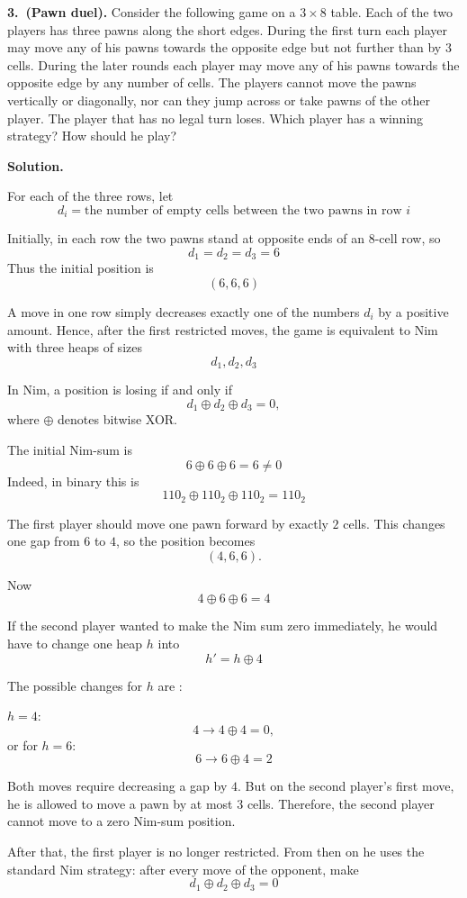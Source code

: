 \textbf{3.\ (Pawn duel).}
Consider the following game on a \(3\times 8\) table.
Each of the two players has three pawns along the short edges.
During the first turn each player may move any of his pawns towards the opposite
edge but not further than by \(3\) cells.
During the later rounds each player may move any of his pawns towards the
opposite edge by any number of cells.
The players cannot move the pawns vertically or diagonally, nor can they jump
across or take pawns of the other player.
The player that has no legal turn loses.
Which player has a winning strategy?
How should he play?

\textbf{Solution.}

For each of the three rows, let
\[
d_i=\text{the number of empty cells between the two pawns in row } i
\]

Initially, in each row the two pawns stand at opposite ends of an \(8\)-cell row, so
\[
d_1=d_2=d_3=6
\]
Thus the initial position is
\[
(6,6,6)
\]

A move in one row simply decreases exactly one of the numbers \(d_i\) by a positive amount. Hence, after the first restricted moves, the game is equivalent to Nim with three heaps of sizes
\[
d_1,d_2,d_3
\]

In Nim, a position is losing if and only if
\[
d_1\oplus d_2\oplus d_3=0,
\]
where \(\oplus\) denotes bitwise XOR.

The initial Nim-sum is
\[
6\oplus 6\oplus 6 = 6\neq 0
\]
Indeed, in binary this is
\[
110_2\oplus 110_2\oplus 110_2 = 110_2
\]

The first player should move one pawn forward by exactly \(2\) cells. This changes one gap from \(6\) to \(4\), so the position becomes
\[
(4,6,6).
\]

Now
\[
4\oplus 6\oplus 6 = 4
\]

If the second player wanted to make the Nim sum zero immediately, he would have to change one heap \(h\) into
\[
h' = h\oplus 4
\]

The possible changes for \(h\) are :

\(h=4\):
\[
4\to 4\oplus 4 = 0,
\]
or for \(h=6\):
\[
6\to 6\oplus 4 = 2
\]

Both moves require decreasing a gap by \(4\). But on the second player's first move, he is allowed to move a pawn by at most \(3\) cells. Therefore, the second player cannot move to a zero Nim-sum position.

After that, the first player is no longer restricted. From then on he uses the standard Nim strategy: after every move of the opponent, make
\[
d_1\oplus d_2\oplus d_3=0
\]

